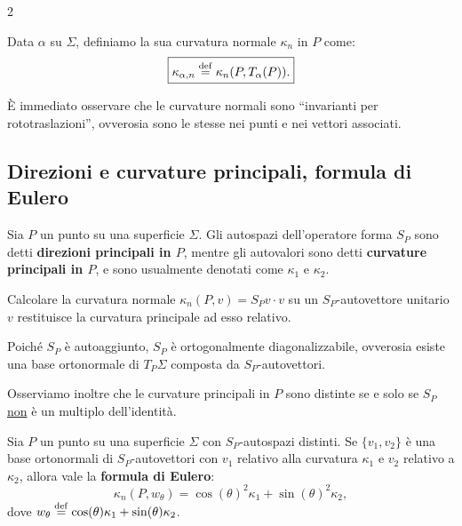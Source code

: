 \begin{multicols*}{2}
\begin{definition}
        Data $\alpha$ su $\Sigma$, definiamo la sua curvatura normale $\kappa_n$ in $P$
        come:
        \[
            \boxed{\kappa_{\alpha, n} \overset{\mathrm{def}}{=} \kappa_n(P, T_\alpha(P)).}
        \]
    \end{definition}

    \begin{remark}
        È immediato osservare che le curvature normali sono ``invarianti per rototraslazioni'',
        ovverosia sono le stesse nei punti e nei vettori associati.
    \end{remark}

    \subsection{Direzioni e curvature principali, formula di Eulero}

    \begin{definition}
        Sia $P$ un punto su una superficie $\Sigma$. Gli autospazi
        dell'operatore forma $S_P$ sono detti \textbf{direzioni principali in $P$},
        mentre gli autovalori sono detti \textbf{curvature principali in $P$}, e sono
        usualmente denotati come $\kappa_1$ e $\kappa_2$.
    \end{definition}

    \begin{remark}
        Calcolare la curvatura normale $\kappa_n(P, v) = S_P v \cdot v$ su un $S_P$-autovettore unitario $v$ restituisce la
        curvatura principale ad esso relativo.
    \end{remark}

    \begin{remark}
        Poiché $S_P$ è autoaggiunto, $S_P$ è ortogonalmente diagonalizzabile,
        ovverosia esiste una base ortonormale di $T_P \Sigma$ composta da
        $S_P$-autovettori. \smallskip

        Osserviamo inoltre che le curvature principali in
        $P$ sono distinte se e solo se $S_P$ \underline{non} è un multiplo
        dell'identità.
    \end{remark}

    \begin{proposition}
        Sia $P$ un punto su una superficie $\Sigma$ con $S_P$-autospazi
        distinti. Se $\{v_1, v_2\}$ è una base ortonormali di $S_P$-autovettori con
        $v_1$ relativo alla curvatura $\kappa_1$ e $v_2$ relativo a $\kappa_2$, allora
        vale la \textbf{formula di Eulero}:
        \begin{equation} \label{eq:eulero} \tag{Eulero}
            \kappa_n(P, w_\theta) = \cos(\theta)^2 \kappa_1 + \sin(\theta)^2 \kappa_2,
        \end{equation}
        dove $w_\theta \overset{\mathrm{def}}{=} \cos(\theta) \kappa_1 + \sin(\theta) \kappa_2$.
    \end{proposition}


\end{multicols*}
